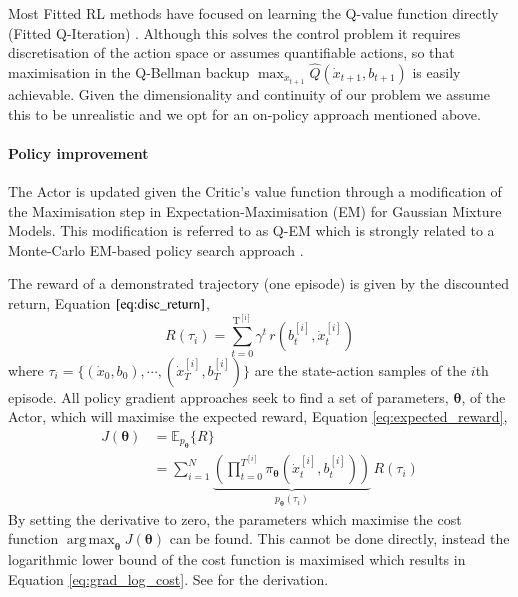 \documentclass[final,5p,times,twocolumn]{elsarticle}
\newcommand{\B}{b}
\newcommand{\U}{\dot{x}}
\newcommand{\Param}{\boldsymbol{\theta}}
\DeclareMathOperator*{\argmax}{arg\,max}
\begin{document}
Most Fitted RL methods have focused on learning the Q-value function directly (Fitted Q-Iteration) 
\cite{NIPS2008_3501,EGW05,Riedmiller2005}. Although this solves the control problem it requires discretisation 
of the action space or assumes quantifiable actions, so that maximisation in the Q-Bellman backup
${\max_{\U_{t+1}} \hat{Q}(\U_{t+1},\B_{t+1})}$ is easily achievable. 
Given the dimensionality and continuity of our problem we assume this to be unrealistic 
and we opt for an on-policy approach mentioned above.


\paragraph{Policy improvement}


The Actor is updated given the Critic's value function through a modification of the Maximisation step in  Expectation-Maximisation (EM) 
for Gaussian Mixture Models. This modification is referred to as Q-EM which is strongly related to a Monte-Carlo EM-based policy 
search approach \cite[p.50]{p_search_surv_2011}. 

The reward of a demonstrated trajectory (one episode) is given by the discounted return, Equation $\ref{eq:disc_return}$,
\begin{equation}\label{eq:disc_return}
 R(\tau_i) = \sum_{t=0}^{\mathrm{T^{[i]}}} \gamma^t \, r(\B^{[i]}_t,\U^{[i]}_t)
\end{equation}
where $\tau_i = \{(\U_0,\B_0),\cdots,(\U_T^{[i]},\B_T^{[i]}) \}$ are the state-action samples of the $i$th episode.
All policy gradient approaches seek to find a set of parameters, $\Param$, of the Actor,
which will maximise the expected reward, Equation \ref{eq:expected_reward},
\begin{align}\label{eq:expected_reward}
 J(\Param) &= \mathbb{E}_{p_{\Param}}\{R\} \nonumber \\
	  &= \sum\limits_{i=1}^{N}   \underbrace{\left( \prod_{t=0}^{T^{[i]}} \pi_{\Param}(\U^{[i]}_t,\B^{[i]}_t) \right)}_{p_{\Param}(\tau_i)} \, R(\tau_i) 
\end{align}
By setting the derivative to zero, the parameters which maximise the cost function $\argmax_{\Param} J(\Param)$
can be found. This cannot be done directly, instead the logarithmic lower bound of the cost function is maximised which results in 
Equation \ref{eq:grad_log_cost}. See \cite[p.50]{p_search_surv_2011} for the derivation. 
\end{document}
